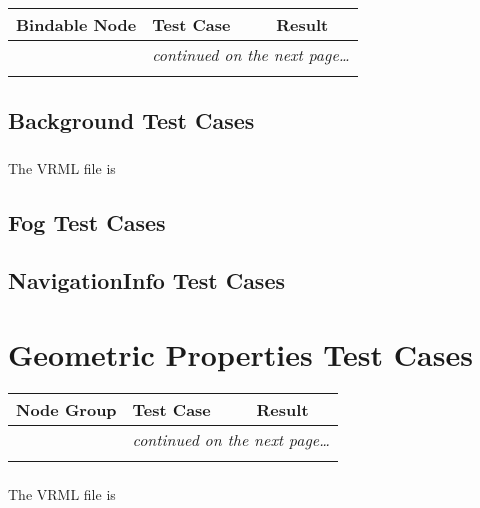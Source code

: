 \documentclass[12pt,letterpaper]{article}
\newcounter{testCaseCtr}
\newcommand{\resetTestCase}{\setcounter{testCaseCtr}{1}}
\begin{document}
\begin{center}
\setlongtables
\begin{longtable}{|l|l|l|}
\hline
\textbf{Bindable Node} & \textbf{Test Case} & \textbf{Result} \\
\hline\hline
\endhead
\cline{2-3}
 & \multicolumn{2}{|r|}{\textsl{continued on the next page\ldots}} \\
\hline
\endfoot
\hline
\endlastfoot
& & \\
\cline{2-3}
\end{longtable}
\end{center}

\subsection{Background Test Cases}

\subsubsection{}
The VRML file is 

\subsection{Fog Test Cases}

\subsection{NavigationInfo Test Cases}

\section{Geometric Properties Test Cases}
\resetTestCase


\begin{center}
\setlongtables
\begin{longtable}{|l|l|l|}
\hline
\textbf{Node Group} & \textbf{Test Case} & \textbf{Result} \\
\hline\hline
\endhead
\cline{2-3}
 & \multicolumn{2}{|r|}{\textsl{continued on the next page\ldots}} \\
\hline
\endfoot
\hline
\endlastfoot
& & \\
\cline{2-3}
\end{longtable}
\end{center}

\subsubsection{}
The VRML file is 
\end{document}
